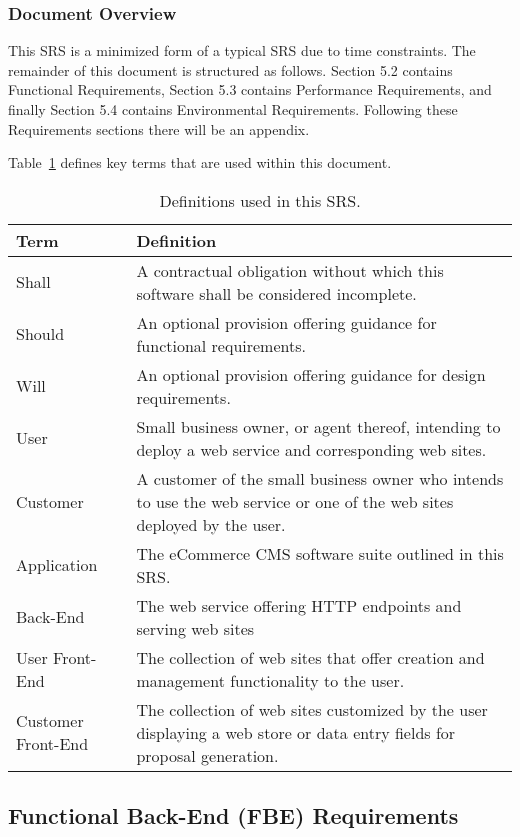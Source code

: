 \documentclass{article}
\begin{document}
\subsubsection{Document Overview}

This SRS is a minimized form of a typical SRS due to time constraints.  The
remainder of this document is structured as follows.  Section 5.2 contains
Functional Requirements, Section 5.3 contains Performance Requirements, and
finally Section 5.4 contains Environmental Requirements.  Following these
Requirements sections there will be an appendix.

Table~\ref{terms} defines key terms that are used within this document.

\begin{table}
    \begin{tabular}{|l|p{11cm}|}\hline
        Term & Definition \\\hline\hline
        Shall & A contractual obligation without which this software shall be considered incomplete. \\\hline
        Should & An optional provision offering guidance for functional requirements. \\\hline
        Will & An optional provision offering guidance for design requirements. \\\hline
        User & Small business owner, or agent thereof, intending to deploy a web service
        and corresponding web sites. \\\hline
        Customer & A customer of the small business owner who intends to use the web service
        or one of the web sites deployed by the user. \\\hline
        Application & The eCommerce CMS software suite outlined in this SRS. \\\hline
        Back-End & The web service offering HTTP endpoints and serving web sites \\\hline
        User Front-End & The collection of web sites that offer creation and management
        functionality to the user. \\\hline
        Customer Front-End & The collection of web sites customized by the user displaying
        a web store or data entry fields for proposal generation.\\\hline
    \end{tabular}
    \caption{Definitions used in this SRS.}
    \label{terms}
\end{table}

\pagebreak
\subsection{Functional Back-End (FBE) Requirements}
\end{document}
